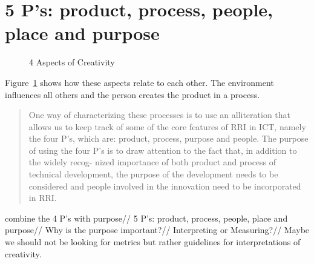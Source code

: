 \section{5 P’s: product, process, people, place and purpose}


\begin{figure}[htb] %
  \centering
  \tikzset{every fit/.append style=text badly centered}
\caption[4 Aspects of Creativity]{4 Aspects of Creativity}
\label{fig:4CreaI}
\end{figure}

\begin{draft}
  Figure~\ref{fig:4CreaI} shows how these aspects relate to each other. The environment influences all others and the person creates the product in a process.
\end{draft}


\begin{quote}
  One way of characterizing these processes is to use an alliteration that allows us to keep track of some of the core features of RRI in ICT, namely the four P's, which are: product, process, purpose and people. The purpose of using the four P's is to draw attention to the fact that, in addition to the widely recog- nized importance of both product and process of technical development, the purpose of the development needs to be considered and people involved in the innovation need to be incorporated in RRI.\@ \autocite[p.203, my emphasis]{Stahl2013}
\end{quote}

\begin{fcom}
  combine the 4 P’s with purpose//
  5 P’s: product, process, people, place and purpose//
  Why is the purpose important?//
  Interpreting or Measuring?//
  Maybe we should not be looking for metrics but rather guidelines for interpretations of creativity.
\end{fcom}

